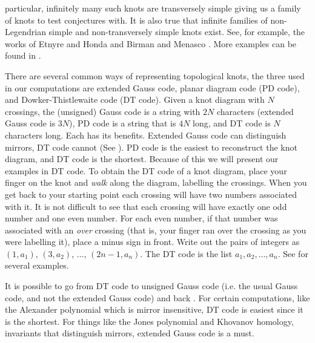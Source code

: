 \documentclass{article}
\theoremstyle{plain}
\begin{document}
        particular, infinitely many such knots are transversely simple giving
        us a family of knots to test conjectures with. It is also true that
        infinite families of non-Legendrian simple and non-transversely simple
        knots exist. See, for example, the works of Etnyre and Honda
        \cite{EtnyreHondaCabling} and Birman and Menasco
        \cite{BirmanMenasco2006}. More examples can be found in
        \cite{Foldvari2019legnonsimple}.
        \par\hfill\par
        There are several common ways of representing topological knots, the
        three used in our computations are extended Gauss code, planar diagram
        code (PD code), and Dowker-Thistlewaite code (DT code). Given a knot
        diagram with $N$ crossings, the (unsigned) Gauss code is a string with $2N$
        characters (extended Gauss code is $3N$),
        PD code is a string that is $4N$ long, and DT code is $N$
        characters long. Each has its benefits. Extended Gauss code
        can distinguish mirrors, DT code cannot
        (See \cite{DOWKER198319}). PD code is the easiest to
        reconstruct the knot diagram, and DT code is the shortest. Because of
        this we will present our examples in DT code. To obtain the DT code of
        a knot diagram, place your finger on the knot and \textit{walk} along
        the diagram, labelling the crossings. When you get back to your starting
        point each crossing will have two numbers associated with it. It is
        not difficult to see that each crossing will have exactly one odd number
        and one even number. For each even number, if that number was associated
        with an \textit{over} crossing (that is, your finger ran over the
        crossing as you were labelling it), place a minus sign in front. Write
        out the pairs of integers as $(1,a_{1})$, $(3,a_{2})$, $\dots$,
        $(2n-1,a_{n})$. The DT code is the list $a_{1},a_{2},\dots,a_{n}$.
        See \cite{KatlasDTCode} for several examples.
        \par\hfill\par
        It is possible to go from DT code to unsigned
        Gauss code (i.e. the usual Gauss code, and not the extended Gauss code)
        and back \cite{KatlasDTCode}. For certain computations,
        like the Alexander polynomial which
        is mirror insensitive, DT code is easiest since it is the shortest.
        For things like the Jones polynomial and Khovanov homology, invariants
        that distinguish mirrors, extended Gauss code is a must.
\end{document}
